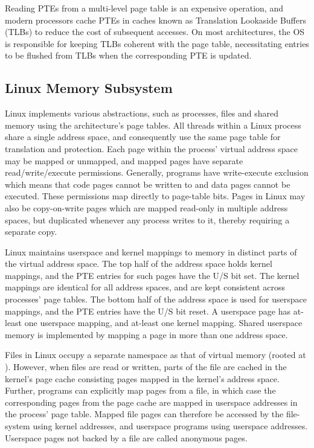 \documentclass[letterpaper,twocolumn,10pt, anonymous]{article}
\begin{document}
Reading PTEs from a multi-level page table is an expensive operation, and 
modern processors cache PTEs in caches known as Translation Lookaside 
Buffers (TLBs) to reduce the cost of subsequent accesses. 
On most architectures, the OS is responsible for keeping TLBs coherent with 
the page table, necessitating entries to be flushed from TLBs when the 
corresponding PTE is updated.

\subsection{Linux Memory Subsystem}
Linux implements various abstractions, such as processes, files and shared
memory using the architecture's page tables.
All threads within a Linux process share a single address space, and 
consequently use the same page table for translation and protection.
Each page within the process' virtual address space may be mapped or 
unmapped, and mapped pages have separate read/write/execute permissions.
Generally, programs have write-execute exclusion which means that 
code pages cannot be written to and data pages cannot be executed.
These permissions map directly to page-table bits.
Pages in Linux may also be copy-on-write pages which are mapped read-only
in multiple address spaces, but duplicated whenever any process writes
to it, thereby requiring a separate copy.

Linux maintains userspace and kernel mappings to memory in distinct 
parts of the virtual address space. 
The top half of the address space holds kernel mappings, and the 
PTE entries for such pages have the U/S bit set. 
The kernel mappings are identical for all address spaces, and are 
kept consistent across processes' page tables.
The bottom half of the address space is used for userspace mappings, 
and the PTE entries have the U/S bit reset.
A userspace page has at-least one userspace mapping, and at-least one
kernel mapping.
Shared userspace memory is implemented by mapping a page in more than 
one address space.

Files in Linux occupy a separate namespace as that of virtual memory
(rooted at \Code{/}).
However, when files are read or written, parts of the file are cached
in the kernel's page cache consisting pages mapped in the kernel's 
address space.
Further, programs can explicitly map pages from a file, in which case 
the corresponding pages from the page cache are mapped in userspace 
addresses in the process' page table.
Mapped file pages can therefore be accessed by the file-system using 
kernel addresses, and userspace programs using userspace addresses.
Userspace pages not backed by a file are called anonymous pages.
\end{document}
